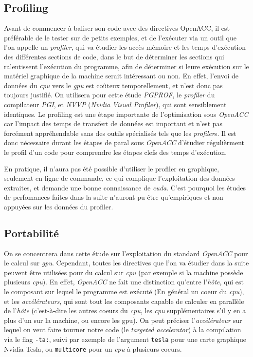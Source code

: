 \documentclass{article}
\begin{document}
\subsection{Profiling}

Avant de commencer à baliser son code avec des directives OpenACC, il est préférable de le tester sur de petits exemples, et de l'exécuter via un outil que l'on appelle un \textit{profiler}, qui va étudier les accès mémoire et les temps d'exécution des différentes sections de code, dans le but de déterminer les sections qui ralentissent l'exécution du programme, afin de déterminer si leure exécution sur le matériel graphique de la machine serait intéressant ou non. En effet, l'envoi de données du \textit{\gls{cpu}} vers le \textit{\gls{gpu}} est coûteux temporellement, et n'est donc pas toujours justifié. On utilisera pour cette étude \textit{PGPROF}, le \textit{profiler} du compilateur \textit{PGI}, et \textit{NVVP} (\textit{Nvidia Visual Profiler}), qui sont sensiblement identiques. Le profiling est une étape importante de l'optimisation sous \textit{OpenACC} car l'impact des temps de transfert de données est important et n'est pas forcément appréhendable sans des outils spécialisés tels que les \textit{profiler}s. Il est donc nécessaire durant les étapes de \gls{paral} sous \textit{OpenACC} d'étudier régulièrment le profil d'un code pour comprendre les étapes clefs des temps d'exécution.

En pratique, il n'aura pas été possible d'utiliser le profiler en graphique, seulement en ligne de commande, ce qui complique l'exploitation des données extraites, et demande une bonne connaissance de \textit{\gls{cuda}}. C'est pourquoi les études de perfomances faites dans la suite n'auront pu être qu'empiriques et non appuyées sur les données du profiler.

\subsection{Portabilité}

On se concentrera dans cette étude sur l'exploitation du standard \textit{OpenACC} pour le calcul sur \textit{\gls{gpu}}. Cependant, toutes les directives que l'on va étudier dans la suite peuvent être utilisées pour du calcul sur \textit{\gls{cpu}} (par exemple si la machine possède plusieurs \textit{\gls{cpu}}). En effet, \textit{OpenACC} ne fait une distinction qu'entre l'\textit{hôte}, qui est le composant sur lequel le programme est exécuté (En général un \gls{coeur} du \textit{\gls{cpu}}), et les \textit{accélérateurs}, qui sont tout les composants capable de calculer en parallèle de l'\textit{hôte} (c'est-à-dire les autres \gls{coeur}s du \textit{\gls{cpu}}, les \textit{\gls{cpu}} supplémentaires s'il y en a plus d'un sur la machine, ou encore les \gls{gpu}). On peut préciser l'\textit{accélérateur} sur lequel on veut faire tourner notre code (le \textit{targeted accelerator}) à la compilation via le flag \texttt{-ta:}, suivi par exemple de l'argument \texttt{tesla} pour une carte graphique Nvidia Tesla, ou \texttt{multicore} pour un \textit{\gls{cpu}} à plusieurs \gls{coeur}s.
\end{document}
